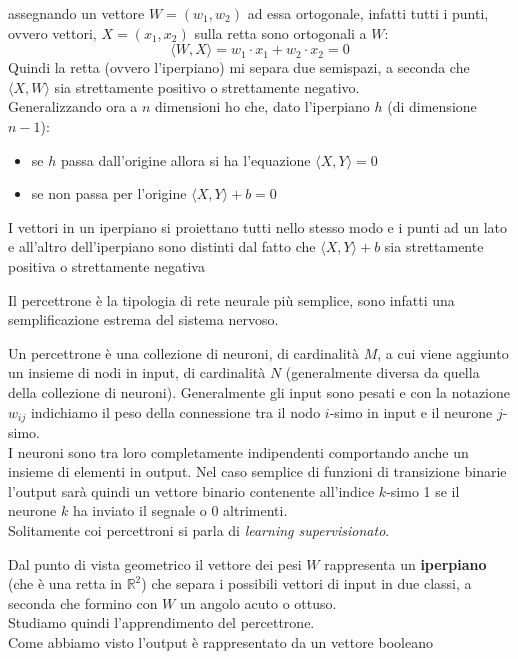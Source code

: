 \documentclass[a4paper,12pt, oneside]{book}
\begin{document}
\begin{shaded}
  assegnando un vettore $W=(w_1,w_2)$ ad essa ortogonale, infatti tutti i punti,
  ovvero vettori, $X=(x_1,x_2)$ sulla retta sono ortogonali a $W$:
  \[\langle W,X\rangle=w_1\cdot x_1+w_2\cdot x_2=0 \]
  Quindi la retta (ovvero l'iperpiano) mi separa due semispazi, a seconda che
  $\langle X,W\rangle$ sia strettamente positivo o strettamente negativo.\\
  Generalizzando ora a $n$ dimensioni ho che, dato l'iperpiano $h$ (di
  dimensione $n-1$):
  \begin{itemize}
    \item se $h$ passa dall'origine allora si ha l'equazione $\langle X,Y\rangle
    =0$
    \item se non passa per l'origine $\langle X,Y\rangle +b=0$ 
    
  \end{itemize}
  I vettori in un iperpiano si proiettano tutti nello stesso modo e i punti ad
  un lato e all'altro dell'iperpiano sono distinti dal fatto che $\langle
  X,Y\rangle +b$ sia strettamente positiva o strettamente negativa
\end{shaded}
Il percettrone è la tipologia di rete neurale più semplice, sono infatti una
semplificazione estrema del sistema nervoso.
\begin{definizione}
  Un percettrone è una collezione di neuroni, di cardinalità $M$, a cui viene
  aggiunto un insieme di nodi in input, di cardinalità $N$ (generalmente
  diversa da quella della collezione di neuroni). Generalmente gli input sono
  pesati e con la notazione $w_{ij}$ indichiamo il peso della connessione tra il
  nodo $i$-simo in input e il neurone $j$-simo.\\
  I neuroni sono tra loro completamente indipendenti comportando anche un
  insieme di elementi in output. Nel caso semplice di funzioni di transizione
  binarie l'output sarà quindi un vettore binario contenente all'indice $k$-simo
  1 se il neurone $k$ ha inviato il segnale o 0 altrimenti. \\
  Solitamente coi percettroni si parla di \textit{learning supervisionato}.
\end{definizione}
Dal punto di vista geometrico il vettore dei pesi $W$ rappresenta un
\textbf{iperpiano} (che è una retta in $\mathbb{R}^2$) che separa i possibili
vettori di input in due classi, a seconda che formino con $W$ un angolo acuto o
ottuso. \\
Studiamo quindi l'apprendimento del percettrone.\\
Come abbiamo visto l'output è rappresentato da un vettore booleano
\end{document}
